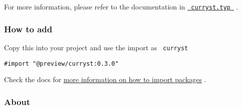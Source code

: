 For more information, please refer to the documentation in
\href{https://github.com/typst/packages/raw/main/packages/preview/curryst/0.3.0/curryst.typ}{\texttt{\ curryst.typ\ }}
.

\subsubsection{How to add}\label{how-to-add}

Copy this into your project and use the import as \texttt{\ curryst\ }

\begin{verbatim}
#import "@preview/curryst:0.3.0"
\end{verbatim}



Check the docs for
\href{https://typst.app/docs/reference/scripting/\#packages}{more
information on how to import packages} .

\subsubsection{About}\label{about}

